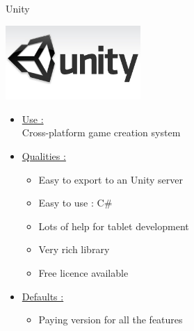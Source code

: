 \documentclass[a4paper,10pt]{beamer}
\begin{document}
			\begin{frame}{Unity}
				\begin{multicols}{2}
					\includegraphics[height=80pt]{images/logos/Logo_Unity.jpg}\\
					
					\columnbreak 
					
					\begin{itemize}
						\item \underline{Use :}\\		
						Cross-platform game creation system 		
						\item \underline{Qualities :}\\
						\begin{itemize}
							\item Easy to export to an Unity server
							\item Easy to use : C\#
							\item Lots of help for tablet development
							\item Very rich library
							\item Free licence available
						\end{itemize}
					\end{itemize}		 
				\end{multicols}
				\begin{itemize}
					\item \underline{Defaults :}\\
					\begin{itemize}
						\item Paying version for all the features
					\end{itemize}
				\end{itemize}
			\end{frame}
			
\end{document}
